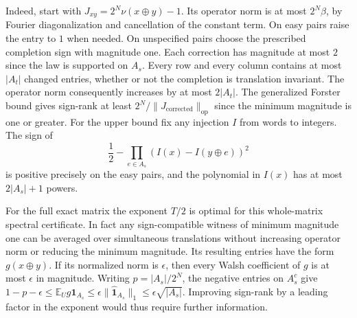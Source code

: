 Indeed, start with $J_{xy}=2^N\nu(x\oplus y)-1$. Its operator norm is at most $2^N\beta$, by Fourier diagonalization and cancellation of the constant term. On easy pairs raise the entry to $1$ when needed. On unspecified pairs choose the prescribed completion sign with magnitude one. Each correction has magnitude at most $2$ since the law is supported on $A_s$. Every row and every column contains at most $|A_t|$ changed entries, whether or not the completion is translation invariant. The operator norm consequently increases by at most $2|A_t|$. The generalized Forster bound gives sign-rank at least $2^N/\|J_{\mathrm{corrected}}\|_{\mathrm{op}}$ since the minimum magnitude is one or greater. For the upper bound fix any injection $I$ from words to integers. The sign of
\[
 \frac12-\prod_{e\in A_s}(I(x)-I(y\oplus e))^2
\]
is positive precisely on the easy pairs, and the polynomial in $I(x)$ has at most $2|A_s|+1$ powers.

For the full exact matrix the exponent $T/2$ is optimal for this whole-matrix spectral certificate. In fact any sign-compatible witness of minimum magnitude one can be averaged over simultaneous translations without increasing operator norm or reducing the minimum magnitude. Its resulting entries have the form $g(x\oplus y)$. If its normalized norm is $\epsilon$, then every Walsh coefficient of $g$ is at most $\epsilon$ in magnitude. Writing $p=|A_s|/2^N$, the negative entries on $A_s^c$ give
$1-p-\epsilon\le\mathbb E_U g\mathbf1_{A_s}\le\epsilon\|\widehat{\mathbf1}_{A_s}\|_1\le\epsilon\sqrt{|A_s|}$. Improving sign-rank by a leading factor in the exponent would thus require further information.
